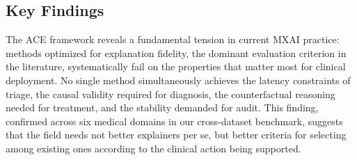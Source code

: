 \documentclass[pdflatex,sn-mathphys-num]{sn-jnl}%
\theoremstyle{thmstyleone}%
\theoremstyle{thmstyletwo}%
\theoremstyle{thmstylethree}%
\begin{document}
\begin{itemize}
\subsection{Key Findings}
\textcolor{color}{The ACE framework reveals a fundamental tension in current MXAI practice: methods optimized for explanation fidelity, the dominant evaluation criterion in the literature, systematically fail on the properties that matter most for clinical deployment. No single method simultaneously achieves the latency constraints of triage, the causal validity required for diagnosis, the counterfactual reasoning needed for treatment, and the stability demanded for audit. This finding, confirmed across six medical domains in our cross-dataset benchmark, suggests that the field needs not better explainers per se, but better criteria for selecting among existing ones according to the clinical action being supported.}



\end{itemize}
\end{document}
